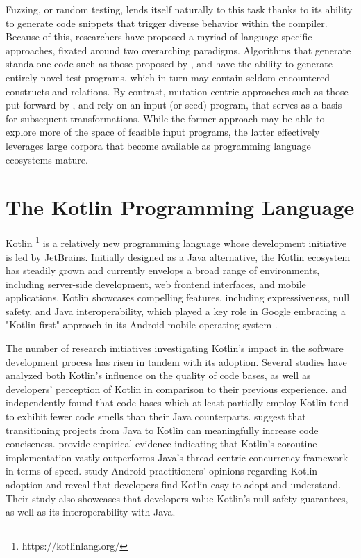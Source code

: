 Fuzzing, or random testing, lends itself naturally to this task thanks to its
ability to generate code snippets that trigger diverse behavior within the compiler.
Because of this, researchers have proposed a myriad of language-specific approaches, 
fixated around two overarching paradigms.
Algorithms that generate standalone code such as those proposed by  
\citet{yang2011finding, holler2012fuzzing, veggalam2016ifuzzer}, and \citet{havrikov2019systematically}
have the ability to generate entirely novel test programs, which in turn may contain
seldom encountered constructs and relations.
By contrast, mutation-centric approaches such as those put forward by 
\citet{le2014compiler, le2015finding, sun2016finding}, and \citet{stepanov2021type}
rely on an input (or seed) program, that serves as a basis for subsequent transformations.
While the former approach may be able to explore more of the
space of feasible input programs, the latter effectively leverages
large corpora that become available as programming language
ecosystems mature.

\section{The Kotlin Programming Language}

Kotlin \footnote{https://kotlinlang.org/} is a relatively new programming language whose development
initiative is led by JetBrains.
Initially designed as a Java alternative, the Kotlin
ecosystem has steadily grown and currently envelops
a broad range of environments, including server-side development,
web frontend interfaces, and mobile applications. 
Kotlin showcases compelling features, including expressiveness,
null safety, and Java interoperability, which played a key role in Google embracing
a "Kotlin-first" approach in its Android mobile operating system \cite{kotlinfirst}.

The number of research initiatives investigating Kotlin's impact 
in the software development process has risen in tandem with its adoption.
Several studies have analyzed both Kotlin's influence
on the quality of code bases, as well as developers' perception
of Kotlin in comparison to their previous experience.
\citet{flauzino2018you}  and \citet{gois2019empirical} independently
found that code bases which at least partially employ Kotlin tend to
exhibit fewer code smells than their Java counterparts. 
\citet{ardito2020effectiveness} suggest that transitioning projects
from Java to Kotlin can meaningfully increase code conciseness.
\citet{chauhan2021performance} provide empirical evidence indicating
that Kotlin's coroutine implementation vastly outperforms
Java's thread-centric concurrency framework in terms of speed.
\citet{oliveira2020adoption} study Android practitioners' opinions regarding
Kotlin adoption and reveal that developers find Kotlin easy
to adopt and understand. 
Their study also showcases that developers value Kotlin's
null-safety guarantees, as well as its interoperability with Java.

